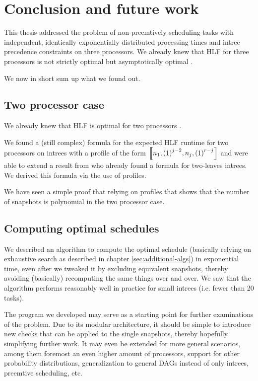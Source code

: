 
\chapter{Conclusion and future work}
\label{chap:conclusion-outlook}

This thesis addressed the problem of non-preemtively scheduling tasks with independent, identically exponentially distributed processing times and intree precedence constraints on three processors. We already knew that HLF for three processors is not strictly optimal \cite{chandyreynoldsshortpaper1975} but asymptotically optimal \cite{journals/siamcomp/PapadimitriouT87}.

We now in short sum up what we found out.

\section{Two processor case}
\label{sec:conclusion-two-processor-case}

We already knew that HLF is optimal for two processors \cite{chandyreynoldsshortpaper1975}.

We found a (still complex) formula for the expected HLF runtime for two processors on intrees with a profile of the form
$\left\llbracket n_1,{(1)}^{j-2},n_j,{(1)}^{r-j} \right\rrbracket$
and were able to extend a result from \cite{MoritzMaasDiploma} who already found a formula for two-leaves intrees. We derived this formula via the use of profiles.

We have seen a simple proof that relying on profiles that shows that the number of snapshots is polynomial in the two processor case.

\section{Computing optimal schedules}
\label{sec:conclusion-optimal-schedules}

We described an algorithm to compute the optimal schedule (basically relying on exhaustive search as described in chapter \ref{sec:additional-algs}) in exponential time, even after we tweaked it by excluding equivalent snapshots, thereby avoiding (basically) recomputing the same things over and over. We saw that the algorithm performs reasonably well in practice for small intrees (i.e. fewer than 20 tasks).

The program we developed may serve as a starting point for further examinations of the problem. Due to its modular architecture, it should be simple to introduce new checks that can be applied to the single snapshots, thereby hopefully simplifying further work. It may even be extended for more general scenarios, among them foremost an even higher amount of processors, support for other probability distributions, generalization to general DAGs instead of only intrees, preemtive scheduling, etc.


